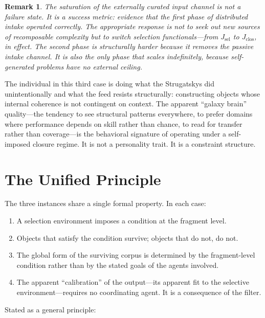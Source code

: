 \documentclass[12pt]{article}
\newtheorem{remark}{Remark}[section]
\newcommand{\Jsel}{J_{\mathrm{sel}}}
\newcommand{\Jclos}{J_{\mathrm{clos}}}
\begin{document}
\begin{remark}
The saturation of the externally curated input channel is not a failure
state. It is a success metric: evidence that the first phase of
distributed intake operated correctly. The appropriate response is not
to seek out new sources of recomposable complexity but to switch
selection functionals—from $\Jsel$ to $\Jclos$, in effect. The second
phase is structurally harder because it removes the passive intake
channel. It is also the only phase that scales indefinitely, because
self-generated problems have no external ceiling.
\end{remark}

The individual in this third case is doing what the Strugatskys did
unintentionally and what the feed resists structurally: constructing objects
whose internal coherence is not contingent on context. The apparent
``galaxy brain'' quality—the tendency to see structural patterns everywhere,
to prefer domains where performance depends on skill rather than chance, to
read for transfer rather than coverage—is the behavioral signature of
operating under a self-imposed closure regime. It is not a personality trait.
It is a constraint structure.

\section{The Unified Principle}
\label{sec:unified}

The three instances share a single formal property. In each case:

\begin{enumerate}[label=\textbf{\arabic*.}]
\item A selection environment imposes a condition at the fragment level.
\item Objects that satisfy the condition survive; objects that do not,
      do not.
\item The global form of the surviving corpus is determined by the
      fragment-level condition rather than by the stated goals of the
      agents involved.
\item The apparent ``calibration'' of the output—its apparent fit to the
      selective environment—requires no coordinating agent. It is a
      consequence of the filter.
\end{enumerate}

Stated as a general principle:
\end{document}
